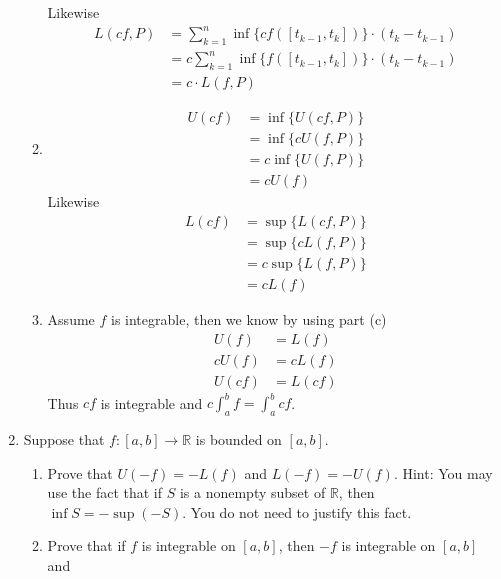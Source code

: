 \documentclass[11pt]{exam}
\newcommand{\sntk}{\sum_{k=1}^{n}}
\begin{document}
\begin{enumerate}
\begin{solution}
\begin{enumerate}
                            Likewise
                            \begin{align*}
                                L(cf, P) &= \sntk \inf\{cf([t_{k-1}, t_k])\} \cdot (t_k - t_{k-1}) \\
                                        &= c \sntk \inf\{f([t_{k-1}, t_k])\} \cdot (t_k - t_{k-1}) \\
                                        &= c \cdot L(f, P)
                            \end{align*}
                        \item 
                        \begin{align*}
                            U(cf) &= \inf\{U(cf, P)\} \\
                                 &= \inf\{cU(f, P)\} \\
                                 &= c \inf\{U(f, P)\} \\
                                 &= c U(f)
                        \end{align*}
                        Likewise
                        \begin{align*}
                            L(cf) &= \sup\{L(cf, P)\} \\
                                 &= \sup\{cL(f, P)\} \\
                                 &= c \sup\{L(f, P)\} \\
                                 &= c L(f)
                        \end{align*}
                        \item Assume $f$ is integrable, then we know by using part (c)
                        \begin{align*}
                            U(f) &= L(f) \\
                            cU(f) &= cL(f) \\
                            U(cf) &= L(cf)
                        \end{align*}
                        Thus $cf$ is integrable and $c\int_{a}^{b} f  = \int_{a}^{b} cf$.
                    \end{enumerate}
                \end{solution}
        \item Suppose that \( f : [a, b] \rightarrow \mathbb{R} \) is bounded on \( [a, b] \).
            \begin{enumerate}
                \item Prove that \( U(-f) = -L(f) \) and \( L(-f) = -U(f) \). Hint: You may use the fact that if \( S \) is a nonempty subset of \( \mathbb{R} \), then \( \inf S = -\sup(-S) \). You do not need to justify this fact.
                \item Prove that if \( f \) is integrable on \( [a, b] \), then \( -f \) is integrable on \( [a, b] \) and
    

\end{enumerate}
\end{enumerate}
\end{document}
